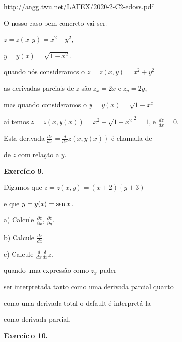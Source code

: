\documentclass[oneside,12pt]{article}
\begin{document}
{\footnotesize

\url{http://angg.twu.net/LATEX/2020-2-C2-edovs.pdf}

}

\msk

O nosso caso bem concreto vai ser:

$z = z(x,y) = x^2 + y^2$,

$y = y(x) = \sqrt{1 - x^2}$.

quando nós  consideramos o $z = z(x,y) = x^2 + y^2$

as derivadas parciais de $z$ são $z_x = 2x$ e $z_y = 2y$,

mas quando  consideramos o $y = y(x) = \sqrt{1 - x^2}$

aí temos $z = z(x,y(x)) = x^2 + \sqrt{1-x^2}^2 = 1$, e $\frac{dz}{dx}=0$.

\msk

Esta derivada $\frac{dz}{dx} = \frac{d}{dx} z(x,y(x))$ é chamada de

 de $z$ com relação a $y$.




\newpage


{\bf Exercício 9.}

Digamos que $z = z(x,y) = (x+2)(y+3)$

e que $y = y(x) = \operatorname{sen} x$.

a) Calcule $\frac{∂z}{∂x}$, $\frac{∂z}{∂y}$.

b) Calcule $\frac{dz}{dx}$.

c) Calcule $\frac{d}{dx}\frac{d}{dx}z$.

\msk

 quando uma expressão como $z_x$ puder

ser interpretada tanto como uma derivada parcial quanto

como uma derivada total o default é interpretá-la

como derivada parcial.


\newpage



{\bf Exercício 10.}
\end{document}
